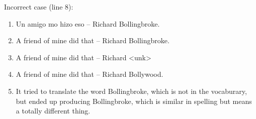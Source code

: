 \documentclass[12pt]{article}
\begin{document}
\begin{enumerate}[label=\textbf{\arabic*.}]
\begin{enumerate}[label=(\alph*)]
\begin{enumerate}[label=\arabic*.]
    \end{enumerate}
    Incorrect case (line 8):
    \begin{enumerate}[label=\arabic*.]
      \item Un amigo mo hizo eso -- Richard Bollingbroke.
      \item A friend of mine did that -- Richard Bollingbroke.
      \item A friend of mine did that -- Richard <unk>
      \item A friend of mine did that -- Richard Bollywood.
      \item It tried to translate the word Bollingbroke, which is not in the vocaburary, but ended up producing Bollingbroke, which is similar in spelling but means a totally different thing.
    \end{enumerate}
  \end{enumerate}
\end{enumerate}
\end{document}
